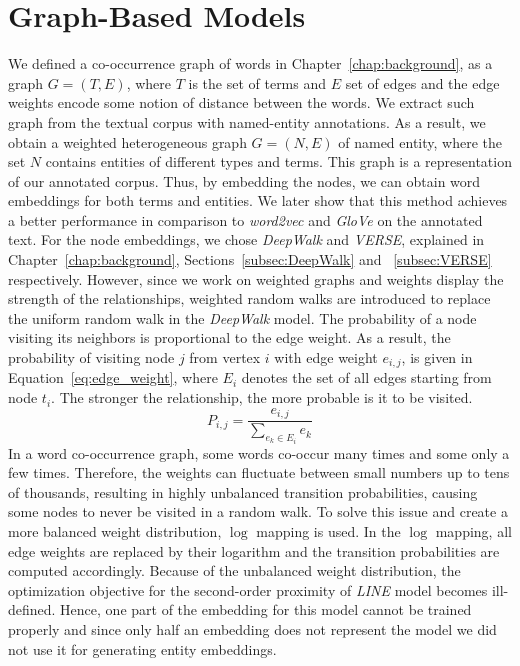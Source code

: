 \section{Graph-Based Models}\label{sec:graph_based}
We defined a co-occurrence graph of words in Chapter~\ref{chap:background}, as a graph $G=(T,E)$, where $T$ is the set of terms and $E$ set of edges and the edge weights encode some notion of distance between the words. We extract such graph from the textual corpus with named-entity annotations. As a result, we obtain a weighted heterogeneous graph $G=(N,E)$ of named entity, where the set $N$ contains entities of different types and terms. This graph is a representation of our annotated corpus. Thus, by embedding the nodes, we can obtain word embeddings for both terms and entities.  We later show that this method achieves a better performance in comparison to \emph{word2vec} and \emph{GloVe} on the annotated text. For the node embeddings, we chose \emph{DeepWalk} and \emph{VERSE}, explained in Chapter~\ref{chap:background}, Sections~\ref{subsec:DeepWalk} and ~\ref{subsec:VERSE} respectively. However, since we work on weighted graphs and weights display the strength of the relationships, weighted random walks are introduced to replace the uniform random walk in the \emph{DeepWalk} model. The probability of a node visiting its neighbors is proportional to the edge weight. As a result, the probability of visiting node $j$ from vertex $i$ with edge weight $e_{i,j}$,  is given in Equation~\ref{eq:edge_weight}, where $ E_{ i }$ denotes the set of all edges starting from node $t_{i}$. The stronger the relationship, the more probable is it to be visited. 
\begin{equation}
P_{i,j}=\frac{e_{i,j}}{\sum _{ e_{ k }\in E_{ i } }^{  }{ e_{k} } }
\label{eq:edge_weight}
\end{equation}
In a word co-occurrence
graph, some words co-occur many times and some only a few times. Therefore, the weights can fluctuate between small numbers up to tens of thousands, resulting in highly unbalanced transition probabilities, causing some nodes to never be visited in a random walk. To solve this issue and create a more balanced weight distribution, $ \log$ mapping is used. In the $\log$ mapping, all edge weights are replaced by their logarithm and the transition probabilities are computed accordingly. Because of the unbalanced weight distribution, the optimization objective for the second-order proximity of \emph{LINE} model becomes ill-defined. Hence, one part of the embedding for this model cannot be trained properly and since only half an embedding does not represent the model we did not use it for generating entity embeddings. \\

